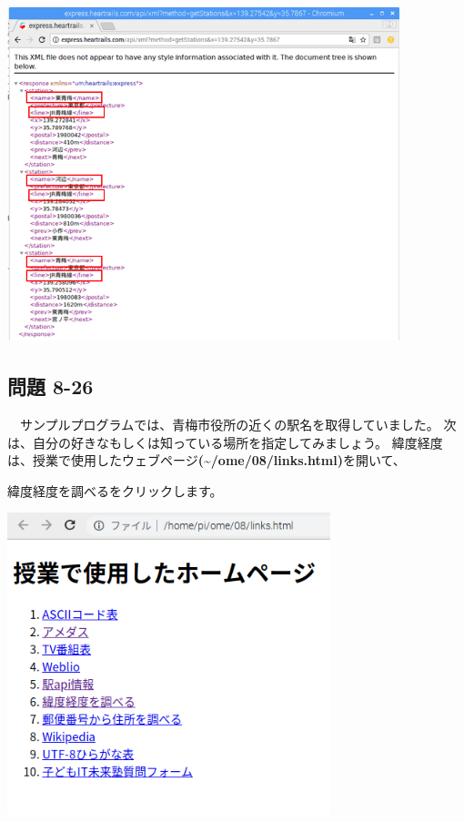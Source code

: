 \documentclass[a4paper,12pt,dvipdfmx]{jarticle}
\begin{document}
\begin{center}
\includegraphics[width=11.409cm,height=9.795cm]{textbook-img052.png}

\end{center}
\clearpage\subsection*{問題 8-26}
\ \ サンプルプログラムでは、青梅市役所の近くの駅名を取得していました。
次は、自分の好きなもしくは知っている場所を指定してみましょう。
緯度経度は、授業で使用したウェブページ\textbf{(\~{}/ome/08/links.html)}を開いて、

緯度経度を調べるをクリックします。



\begin{center}
\includegraphics[width=9.398cm,height=8.784cm]{textbook-img017.png}

\end{center}
\end{document}
